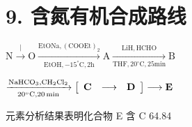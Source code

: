 \section*{9. 含氮有机合成路线}
$
\mathrm{N} \stackrel {\mid} {\longrightarrow} \mathrm{O} \xrightarrow [ \mathrm{EtOH} , - 1 5 ^ {\circ} \mathrm{C} , 2 \mathrm{h} ]{\mathrm{EtONa} , (\mathrm{COOEt}) _ {2}} \mathrm{A} \xrightarrow [ \mathrm{THF} , 2 0 ^ {\circ} \mathrm{C} , 2 5 \mathrm{min} ]{\mathrm{LiH} , \mathrm{HCHO}} \mathrm{B}
$

$
\xrightarrow [ 2 0 ^ {\circ} \mathrm{C} , 2 0 \min ]{\mathrm{NaHCO} _ {3} , \mathrm{CH} _ {2} \mathrm{Cl} _ {2}} \left[ \begin{array}{c c c} \mathbf {C} & \longrightarrow & \mathbf {D} \end{array} \right] \longrightarrow \mathbf {E}
$

元素分析结果表明化合物 E 含 C 64.84%
